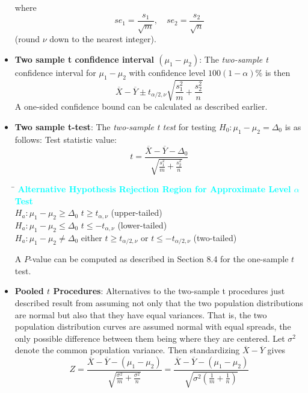 \documentclass{report}
\begin{document}
\begin{itemize}
\[        \]
        where
        \[
            se_1 = \frac{s_1}{\sqrt{m}}, \quad se_2 = \frac{s_2}{\sqrt{n}}
        \]
        (round $\nu$ down to the nearest integer).
    \item \textbf{Two sample t confidence interval $(\mu_{1} - \mu_{2})$}:
        The \textit{two-sample t} confidence interval for $\mu_1 - \mu_2$ with confidence level $100(1 - \alpha)\%$ is then
        \[
            \overline{X} - \overline{Y} \pm t_{\alpha/2, \nu} \sqrt{\frac{s_1^2}{m} + \frac{s_2^2}{n}}
        \]
        A one-sided confidence bound can be calculated as described earlier.
    \item \textbf{Two sample t-test}:
        The \textit{two-sample t test} for testing $H_0: \mu_1 - \mu_2 = \Delta_0$ is as follows:
        \bigbreak \noindent 
        Test statistic value:
        \[
            t = \frac{\overline{X} - \overline{Y} - \Delta_0}{\sqrt{\frac{s_1^2}{m} + \frac{s_2^2}{n}}}
        \]
        \bigbreak \noindent 
        \begin{tabbing}
            \hspace{3cm} \= \kill
            \textcolor{cyan}{\textbf{Alternative Hypothesis}} \> \textcolor{cyan}{\textbf{Rejection Region for Approximate Level $\alpha$ Test}} \\
            $H_a: \mu_1 - \mu_2 \geq \Delta_0$ \> $t \ge t_{\alpha, \nu}$ (upper-tailed) \\
            $H_a: \mu_1 - \mu_2 \leq \Delta_0$ \> $t \le -t_{\alpha, \nu}$ (lower-tailed) \\
            $H_a: \mu_1 - \mu_2 \neq \Delta_0$ \> either $t \ge t_{\alpha/2, \nu}$ or $t \le -t_{\alpha/2, \nu}$ (two-tailed) \\
        \end{tabbing}
        \bigbreak \noindent 
        A $P$-value can be computed as described in Section 8.4 for the one-sample $t$ test.
    \item \textbf{Pooled $t$ Procedures}:
        Alternatives to the two-sample t procedures just described result from assuming not
        only that the two population distributions are normal but also that they have equal
        variances. That is, the two population distribution curves are assumed
        normal with equal spreads, the only possible difference between them being where
        they are centered.
        \bigbreak \noindent 
        Let $\sigma^2$ denote the common population variance. Then standardizing $\overline{X} - \overline{Y}$ gives
        \[
            Z = \frac{\overline{X} - \overline{Y} - (\mu_1 - \mu_2)}{\sqrt{\frac{\sigma^2}{m} + \frac{\sigma^2}{n}}} = \frac{\overline{X} - \overline{Y} - (\mu_1 - \mu_2)}{\sqrt{\sigma^2 \left( \frac{1}{m} + \frac{1}{n} \right)}}
\]
\end{itemize}
\end{document}
